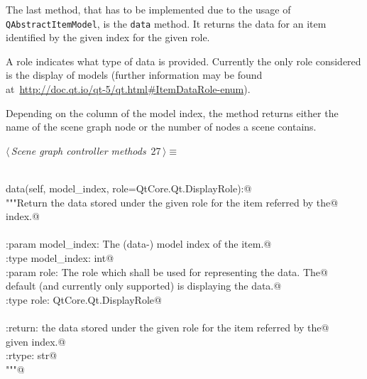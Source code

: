 \documentclass[
    a4paper,      %
    10pt,         %
    openright,    %
    notitlepage,  %
    parskip=half, %
]{scrreprt}       %
\theoremstyle{definition}                    %
\begin{document}
The last method, that has to be implemented due to the usage of
\verb+QAbstractItemModel+, is the \verb+data+ method. It returns the data for an
item identified by the given index for the given role.

A role indicates what type of data is provided. Currently the only role
considered is the display of models (further information may be found
at~\url{http://doc.qt.io/qt-5/qt.html#ItemDataRole-enum}).

Depending on the column of the model index, the method returns either the name
of the scene graph node or the number of nodes a scene contains.

\begin{flushleft} \small
\begin{minipage}{\linewidth}\label{scrap23}\raggedright\small
{} $\langle\,${\itshape Scene graph controller methods}\nobreak\ {\footnotesize {27}}$\,\rangle\equiv$
\vspace{-1ex}
\begin{list}{}{} \item
\mbox{}\lstinline@@\\
\mbox{}\lstinline@def data(self, model_index, role=QtCore.Qt.DisplayRole):@\\
\mbox{}\lstinline@    """Return the data stored under the given role for the item referred by the@\\
\mbox{}\lstinline@    index.@\\
\mbox{}\lstinline@@\\
\mbox{}\lstinline@    :param model_index: The (data-) model index of the item.@\\
\mbox{}\lstinline@    :type model_index: int@\\
\mbox{}\lstinline@    :param role: The role which shall be used for representing the data. The@\\
\mbox{}\lstinline@                 default (and currently only supported) is displaying the data.@\\
\mbox{}\lstinline@    :type role:  QtCore.Qt.DisplayRole@\\
\mbox{}\lstinline@@\\
\mbox{}\lstinline@    :return: the data stored under the given role for the item referred by the@\\
\mbox{}\lstinline@             given index.@\\
\mbox{}\lstinline@    :rtype:  str@\\
\mbox{}\lstinline@    """@\\
\mbox{}\lstinline@@\\

\end{list}
\end{minipage}
\end{flushleft}
\end{document}
